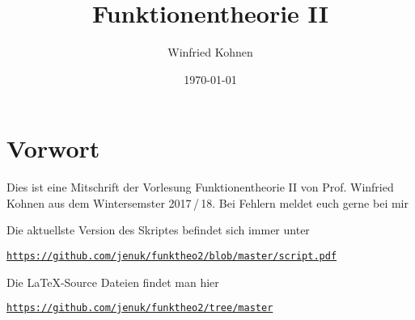 \documentclass[]{scrbook}
\title{Funktionentheorie II}
\author{Winfried Kohnen}
\date{\today}
\begin{document}
\pagestyle{plain}

\maketitle

\chapter*{Vorwort}

Dies ist eine Mitschrift der Vorlesung Funktionentheorie II von Prof. Winfried Kohnen aus dem Wintersemster 2017\,/\,18.
Bei Fehlern meldet euch gerne bei mir

\begin{center}
\end{center}

Die aktuellste Version des Skriptes befindet sich immer unter
\begin{center}
\texttt{\url{https://github.com/jenuk/funktheo2/blob/master/script.pdf}}
\end{center}

Die \LaTeX-Source Dateien findet man hier
\begin{center}
\texttt{\url{https://github.com/jenuk/funktheo2/tree/master}}
\end{center}

\tableofcontents
\clearpage

\setcounter{page}{0}
\pagestyle{fancy}









\begin{appendices}


\printindex
\end{appendices}
\end{document}
